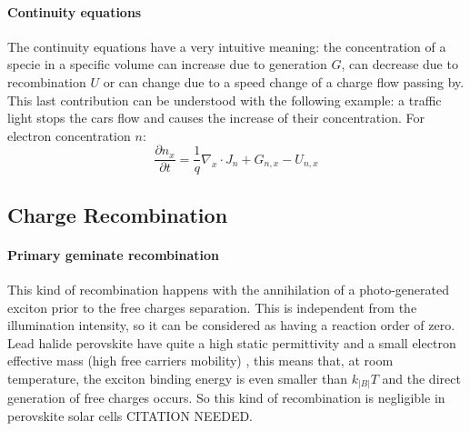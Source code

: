 		\paragraph{Continuity equations} The continuity equations have a very intuitive meaning: the concentration of a specie in a specific volume can increase due to generation $G$, can decrease due to recombination $U$ or can change due to a speed change of a charge flow passing by.
		This last contribution can be understood with the following example: a traffic light stops the cars flow and causes the increase of their concentration.
		For electron concentration $n$:
		\begin{equation}
			\frac{\partial n_x}{\partial t} = \frac{1}{q}\nabla_x \cdot J_n + G_{n,x} - U_{n,x}
		\end{equation}



	\subsection{Charge Recombination}

		\paragraph{Primary geminate recombination} \label{intro_geminate} This kind of recombination happens with the annihilation of a photo-generated exciton prior to the free charges separation.
		This is independent from the illumination intensity, so it can be considered as having a reaction order of zero.
		Lead halide perovskite have quite a high static permittivity \cite{Moia2019} and a small electron effective mass (high free carriers mobility) \cite{Herz2017}, this means that, at room temperature, the exciton binding energy is even smaller than $k_|B|T$ \cite{Miyata2015,Galkowski2016,Tvingstedt2015} and the direct generation of free charges occurs.
		So this kind of recombination is negligible in perovskite solar cells CITATION NEEDED.

